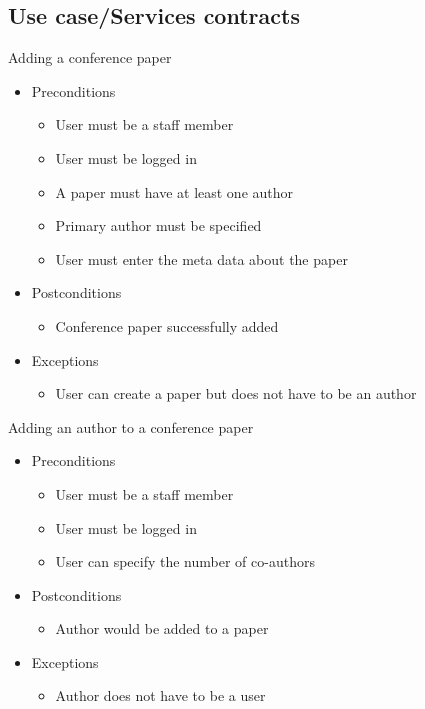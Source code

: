 \documentclass[a4paper,12pt]{article}
\begin{document}
\subsection{Use case/Services contracts}
Adding a conference paper
\begin{itemize}
    \item Preconditions
    \begin{itemize}
        \item User must be a staff member
        \item User must be logged in
        \item A paper must have at least one author
         \item Primary author must be specified
        \item User must enter the meta data about the paper
    \end{itemize}
    \item Postconditions
    \begin{itemize}
        \item Conference paper successfully added
    \end{itemize}
    \item Exceptions
    \begin{itemize}
        \item User can create a paper but does not have to be an author
    \end{itemize}
\end{itemize}
Adding an author to a conference paper
\begin{itemize}
    \item Preconditions
    \begin{itemize}
        \item User must be a staff member
        \item User must be logged in
        \item User can specify the number of co-authors
       
    \end{itemize}
    \item Postconditions
    \begin{itemize}
        \item Author would be added to a paper
    \end{itemize}
    \item Exceptions
    \begin{itemize}
        \item Author does not have to be a user
    \end{itemize}
\end{itemize}
\end{document}
